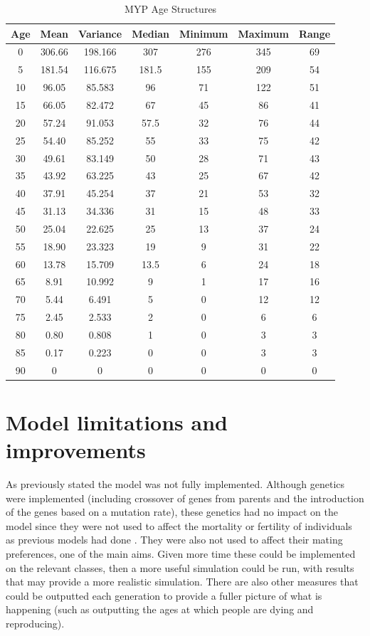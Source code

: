 \documentclass[authoryearcitations]{UoYCSproject}
\begin{document}
\begin{table}[h]
\caption{MYP Age Structures}
\label{tbl:mypAge}
\begin{tabular}{c c c c c c c}
\textbf{Age} & \textbf{Mean} & \textbf{Variance} & \textbf{Median} & \textbf{Minimum} & \textbf{Maximum} & \textbf{Range} \\\hline
0 & 306.66 & 198.166 & 307 & 276 & 345 & 69 \\\hline
5 & 181.54 & 116.675 & 181.5 & 155 & 209 & 54 \\\hline
10 & 96.05 & 85.583 & 96 & 71 & 122 & 51 \\\hline
15 & 66.05 & 82.472 & 67 & 45 & 86 & 41 \\\hline
20 & 57.24 & 91.053 & 57.5 & 32 & 76 & 44 \\\hline
25 & 54.40 & 85.252 & 55 & 33 & 75 & 42 \\\hline
30 & 49.61 & 83.149 & 50 & 28 & 71 & 43 \\\hline
35 & 43.92 & 63.225 & 43 & 25 & 67 & 42 \\\hline
40 & 37.91 & 45.254 & 37 & 21 & 53 & 32 \\\hline
45 & 31.13 & 34.336 & 31 & 15 & 48 & 33 \\\hline
50 & 25.04 & 22.625 & 25 & 13 & 37 & 24 \\\hline
55 & 18.90 & 23.323 & 19 & 9 & 31 & 22 \\\hline
60 & 13.78 & 15.709 & 13.5 & 6 & 24 & 18 \\\hline
65 & 8.91 & 10.992 & 9 & 1 & 17 & 16 \\\hline
70 & 5.44 & 6.491 & 5 & 0 & 12 & 12 \\\hline
75 & 2.45 & 2.533 & 2 & 0 & 6 & 6 \\\hline
80 & 0.80 & 0.808 & 1 & 0 & 3 & 3 \\\hline
85 & 0.17 & 0.223 & 0 & 0  & 3 & 3 \\\hline
90 & 0 & 0 & 0 & 0 & 0 & 0
\end{tabular}
\end{table}

\section{Model limitations and improvements}
As previously stated the model was not fully implemented. Although genetics were implemented (including crossover of genes from parents and the introduction of the genes based on a mutation rate), these genetics had no impact on the model since they were not used to affect the mortality or fertility of individuals as previous models had done \cite{mateChoice2013}. They were also not used to affect their mating preferences, one of the main aims. Given more time these could be implemented on the relevant classes, then a more useful simulation could be run, with results that may provide a more realistic simulation. There are also other measures that could be outputted each generation to provide a fuller picture of what is happening (such as outputting the ages at which people are dying and reproducing).
\end{document}
